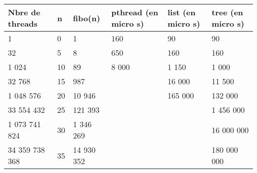 \usepackage{array}
\begin{tabular}{|l|l|l|l|l|l|}
  \hline
  Nbre de threads & n & fibo(n)  & pthread (en micro s) & list (en micro s) & tree (en micro s)\\
  \hline
  1              & 0  & 1          &  160   & 90      & 90           \\
  32             & 5  & 8          &  650   & 160     & 160          \\
  1 024          & 10 & 89         &  8 000 & 1 150   & 1 000        \\
  32 768         & 15 & 987        &        & 16 000  & 11 500       \\
  1 048 576      & 20 & 10 946     &        & 165 000 & 132 000      \\
  33 554 432     & 25 & 121 393    &        &         & 1 456 000    \\
  1 073 741 824  & 30 & 1 346 269  &        &         & 16 000 000   \\
  34 359 738 368 & 35 & 14 930 352 &        &         & 180 000 000  \\
\hline
\end{tabular}
